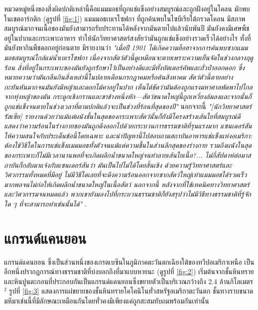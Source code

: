 \documentclass[10pt,twocolumn,letterpaper]{article}
\begin{document}
หมวดหมู่หนึ่งของสิ่งผิดปกติเหล่านี้คือแมมมอธที่ถูกแช่แข็งอย่างสมบูรณ์และถูกฝังอยู่ในโคลน มักพบในเขตอาร์กติก (ดูรูปที่ \ref{fig:1}) แมมมอธเบเรโซฟกา ที่ถูกค้นพบในไซบีเรียใต้กรวดโคลน มีสภาพสมบูรณ์มากจนเนื้อของมันยังสามารถรับประทานได้หลังจากมันตายไปแล้วนับพันปี มันยังคงมีเศษพืชอยู่ในปากและกระเพาะอาหาร ทำให้นักวิทยาศาสตร์สงสัยว่ามันถูกแช่แข็งอย่างรวดเร็วได้อย่างไร ทั้งที่มันยังหากินพืชดอกอยู่ก่อนตาย \cite{17} มีรายงานว่า \textit{"เมื่อปี 1901 ได้เกิดความฮือฮาจากการค้นพบซากแมมมอธสมบูรณ์ใกล้แม่น้ำเบเรโซฟกา เนื่องจากสัตว์ตัวนี้ดูเหมือนจะตายเพราะความเย็นจัดในช่วงกลางฤดูร้อน สิ่งที่อยู่ในกระเพาะของมันยังถูกรักษาไว้เป็นอย่างดีและมีทั้งบัตเตอร์คัพและถั่วป่าออกดอก ซึ่งหมายความว่ามันกลืนกินสิ่งเหล่านี้ในปลายเดือนกรกฎาคมหรือต้นสิงหาคม สัตว์ตัวนี้ตายอย่างกะทันหันมากจนมันยังมีหญ้าและดอกไม้คาอยู่ในปาก เห็นได้ชัดว่ามันต้องถูกแรงมหาศาลพัดพาไปไกลจากทุ่งหญ้าของมัน กระดูกเชิงกรานและขาข้างหนึ่งหัก—สัตว์ขนาดใหญ่นี้ถูกเหวี่ยงล้มลงและจากนั้นก็ถูกแช่แข็งจนตายในช่วงเวลาที่ตามปกติแล้วจะเป็นช่วงที่ร้อนที่สุดของปี"} \cite{18} นอกจากนี้ \textit{"[นักวิทยาศาสตร์รัสเซีย] รายงานด้วยว่าแม้แต่ผนังชั้นในสุดของกระเพาะสัตว์นั้นก็ยังมีโครงสร้างเส้นใยที่สมบูรณ์ดี แสดงว่าความร้อนในร่างกายของมันถูกดึงออกไปด้วยกระบวนการธรรมชาติที่รุนแรงมาก แซนเดอร์สันให้ความสนใจกับประเด็นข้อนี้โดยเฉพาะ และนำปัญหานี้ไปสอบถามสถาบันอาหารแช่แข็งแห่งอเมริกา: ต้องใช้วิธีใดในการแช่แข็งแมมมอธทั้งตัวจนแม้แต่ความชื้นในส่วนลึกสุดของร่างกาย รวมถึงผนังในสุดของกระเพาะก็ไม่มีเวลานานพอที่จะเกิดผลึกน้ำขนาดใหญ่จนทำลายเส้นใยเนื้อ?... ไม่กี่สัปดาห์ต่อมาสถาบันก็กลับมาแจ้งกับแซนเดอร์สันว่า มันเป็นไปไม่ได้โดยสิ้นเชิง ด้วยความรู้วิทยาศาสตร์และวิศวกรรมทั้งหมดที่มีอยู่ ไม่มีวิธีใดเลยที่จะดึงความร้อนออกจากซากสัตว์ใหญ่เท่าแมมมอธได้รวดเร็วมากพอจนไม่ก่อให้เกิดผลึกน้ำขนาดใหญ่ในเนื้อสัตว์ นอกจากนี้ หลังจากที่ใช้เทคนิคทางวิทยาศาสตร์และวิศวกรรมจนหมดแล้ว พวกเขายังมองไปที่กระบวนธรรมชาติก็ยังสรุปว่าไม่มีวิธีทางธรรมชาติที่รู้จักใด ๆ ที่จะสามารถทำเช่นนั้นได้"} \cite{19}.

\section{แกรนด์แคนยอน}

แกรนด์แคนยอน ซึ่งเป็นส่วนหนึ่งของเกรตเบซินในภูมิภาคตะวันตกเฉียงใต้ของทวีปอเมริกาเหนือ เป็นอีกหนึ่งปรากฏการณ์ทางธรรมชาติที่บ่งบอกถึงที่มาแบบหายนะ (ดูรูปที่ \ref{fig:2}) เริ่มต้นจากชั้นหินทรายและหินปูนตะกอนที่ประกอบกันเป็นแกรนด์แคนยอนซึ่งขยายตัวเป็นบริเวณกว้างถึง 2.4 ล้านกิโลเมตร$^2$ \cite{21} รูปที่ \ref{fig:3} แสดงการแผ่ขยายของชั้นหินทรายโคโคนิโนทั่วสหรัฐอเมริกาตะวันตก ชั้นทางราบขนาดมหึมาเช่นนี้ที่มีลักษณะเหมือนกันโดยทั่วคงมีเพียงแค่ถูกสะสมทับถมพร้อมกันเท่านั้น
\end{document}
